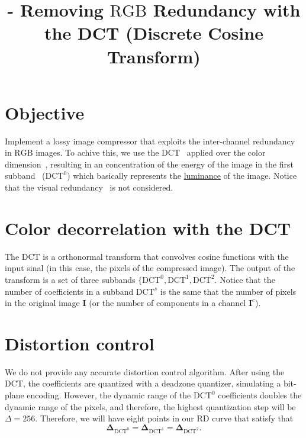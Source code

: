 

\title{\SM{} - Removing $\text{RGB}$ Redundancy with the DCT (Discrete Cosine Transform)}

\maketitle
\tableofcontents

\section{Objective}
Implement a lossy image compressor that exploits the inter-channel
redundancy~\cite{vruiz__information_theory} in $\text{RGB}$ images. To
achive this, we use the DCT~\cite{vruiz__DCT} applied over the color
dimension~\cite{vruiz__image_IO}, resulting in an concentration of the
energy of the image in the first
subband~\cite{vruiz__transform_coding} ($\text{DCT}^0$) which
basically represents the
\href{https://en.wikipedia.org/wiki/Luminance}{luminance} of the
image. Notice that the visual
redundancy~\cite{vruiz__visual_redundancy} is not considered.

\section{Color decorrelation with the DCT}
The DCT is a orthonormal transform that convolves cosine functions
with the input sinal (in this case, the pixels of the compressed
image). The output of the transform is a set of three subbands
$\{\text{DCT}^0, \text{DCT}^1, \text{DCT}^2$. Notice that the number
of coefficients in a subband $\text{DCT}^s$ is the same that the
number of pixels in the original image $\mathbf{I}$ (or the number of
components in a channel $\mathbf{I}^c$).

\section{Distortion control}
We do not provide any accurate distortion control algorithm.  After
using the DCT, the coefficients are quantized with a deadzone
quantizer, simulating a bit-plane encoding. However, the dynamic range
of the $\text{DCT}^0$ coefficients doubles the dynamic range of the
pixels, and therefore, the highest quantization step will be
$\Delta=256$. Therefore, we will have eight points in our RD curve
that satisfy that
\begin{equation}
  \mathbf{\Delta}_{\text{DCT}^0} = \mathbf{\Delta}_{\text{DCT}^1} = \mathbf{\Delta}_{\text{DCT}^2}.
  \label{eq:simple_Q}
\end{equation}

